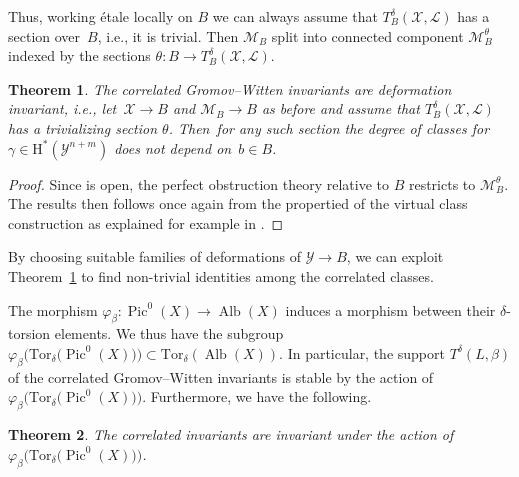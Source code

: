 \documentclass[pdftex]{sigma}
\newcommand{\Tor}{\mathrm{Tor}}
\newcommand{\vir}[1]{\big[#1\big]^\mathrm{vir}}
\newcommand{\ev}{\mathrm{ev}}
\newcommand{\Pic}{\operatorname{Pic}}
\newcommand{\Alb}{\operatorname{Alb}}
\newcommand{\bfw}{ {\boldsymbol w} }
\renewcommand{\L}{\mathcal{L}}
\newcommand{\M}{\mathcal{M}}
\newcommand{\X}{\mathcal{X}}
\newcommand{\Y}{\mathcal{Y}}
\numberwithin{equation}{section}
\newtheorem{theo}{Theorem}[section]
\theoremstyle{definition}
\begin{document}
Thus, working \'etale locally on $B$ we can always assume that
$T^\delta_B(\X,\L)$ has a section over~$B$, i.e., it is trivial. Then $\M_B$ split into connected component $\M_B^\theta$ indexed by the sections $\theta\colon B \to T^\delta_B(\X,\L)$.

\begin{theo}\label{thm:definvariants}
The correlated Gromov--Witten invariants are deformation invariant, i.e., let~${\X\to B}$ and $\M_B\to B$ as before and assume that $T^\delta_B(\X,\L)$ has a trivializing section $\theta$. Then~for any such section the degree of classes \smash{$\ev^*\gamma\cap\vir{\M_b^{\theta(b)}}$} for $\gamma\in\text{H}^*(\Y^{n+m})$ does not depend on~${b\in B}$.
\end{theo}

\begin{proof}
 Since \smash{$\M_B^\theta\to \M_B$} is open, the perfect obstruction theory  relative to $B$ restricts to $\M_B^\theta$. The results then follows once again from the propertied of the virtual class construction \cite{behrend1997intrinsic,manolache2012virtual} as explained for example in \cite[Appendix~A]{mandel2020descendant}.
\end{proof}

By choosing suitable families of deformations of $\Y\to B$, we can exploit Theorem~\ref{thm:definvariants} to find non-trivial identities among the correlated classes.

The morphism $\varphi_\beta\colon\Pic^0(X)\to\Alb(X)$ induces a morphism between their $\delta$-torsion elements. We thus have the subgroup $\varphi_\beta\bigl(\Tor_\delta\bigl(\Pic^0(X)\bigr)\bigr)\subset\Tor_\delta(\Alb(X))$. In particular, the support $T^\delta(L,\beta)$ of the correlated Gromov--Witten invariants is stable by the action of $\varphi_\beta\bigl(\Tor_\delta\bigl(\Pic^0(X)\bigr)\bigr)$. Furthermore, we have the following.

\begin{theo}\label{theo-torsor-invariance}
 The correlated invariants \smash{$\langle\langle\gamma_1,\dots,\gamma_m,\widetilde{\gamma}_1,\dots,\widetilde{\gamma}_n\rangle\rangle^\delta_{g,\beta,\bfw}$} are invariant under the action of $\varphi_\beta\bigl(\Tor_\delta\bigl(\Pic^0(X)\bigr)\bigr)$.
\end{theo}
\end{document}
